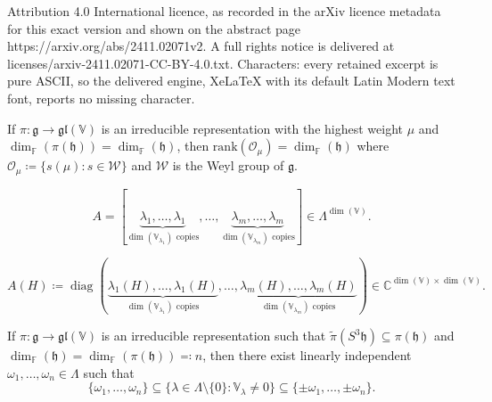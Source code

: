 \documentclass[10pt,a4paper]{amsart}
\DeclareMathOperator{\diag}{diag}
\newcommand{\FF}{\mathbb{F}} %
\newcommand{\W}{\mathcal{W}}
\newcommand{\rank}{\mathrm{rank}} %
\begin{document}
Attribution 4.0 International licence, as recorded in the arXiv licence metadata for this exact version and shown on the abstract page https://arxiv.org/abs/2411.02071v2. A full rights notice is delivered at licenses/arxiv-2411.02071-CC-BY-4.0.txt. Characters: every retained excerpt is pure ASCII, so the delivered engine, XeLaTeX with its default Latin Modern text font, reports no missing character.
\begin{lemma}\label{lem:rank-orbit}
If $\pi: \mathfrak{g} \to \mathfrak{gl}(\mathbb{V})$ is an irreducible representation with the highest weight $\mu$ and $\dim_\FF (\pi(\mathfrak{h}))= \dim_\FF(\mathfrak{h})$,  then $\rank ( \mathcal{O}_\mu ) = \dim_\FF(\mathfrak{h})$ where $\mathcal{O}_\mu \coloneqq \{s(\mu): s\in \W \}$ and $\W$ is the Weyl group of $\mathfrak{g}$.
\end{lemma}

\begin{equation}\label{lem:rank-orbit:eq1}
A = [
\underbrace{\lambda_1,\dots, \lambda_1}_{\dim (\mathbb{V}_{\lambda_1}) \text{~copies}},\dots,  \underbrace{\lambda_m,\dots, \lambda_m}_{\dim (\mathbb{V}_{\lambda_m}) \text{~copies}} ] \in \Lambda^{\dim (\mathbb{V})}.
\end{equation}

\begin{equation}\label{lem:rank-orbit:eq2}
A(H) \coloneqq \diag \left(
\underbrace{\lambda_1(H),\dots, \lambda_1(H)}_{\dim (\mathbb{V}_{\lambda_1}) \text{~copies}},\dots,  \underbrace{\lambda_m(H),\dots, \lambda_m(H)}_{\dim (\mathbb{V}_{\lambda_m}) \text{~copies}} \right) \in \mathbb{C}^{\dim (\mathbb{V}) \times \dim (\mathbb{V})}.
\end{equation}

\begin{lemma}\label{prop: Gauss elimination}
If $\pi: \mathfrak{g} \to \mathfrak{gl}(\mathbb{V})$ is an irreducible representation such that $\widetilde{\pi} \left( S^3 \mathfrak{h}\right)\subseteq \pi(\mathfrak{h})$ and  $\dim_\FF( \mathfrak{h} ) = \dim_\FF(  \pi(\mathfrak{h}) ) \eqqcolon n$,  then there exist {linearly independent} $\omega_1,\dots,  \omega_n \in \Lambda$ such that 
\[
\{\omega_1,\dots,  \omega_n\} \subseteq 
\{\lambda\in \Lambda\setminus \{0\}: \mathbb{V}_{\lambda} \ne 0\}
\subseteq 
\{\pm \omega_1,\dots,  \pm \omega_n\}. 
\]
\end{lemma}
\end{document}
